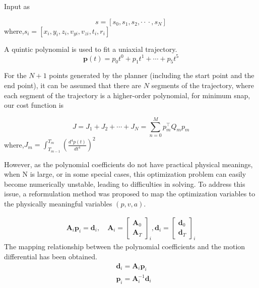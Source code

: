 \documentclass[times,authoryear]{elsarticle}
\begin{document}
Input as

\begin{equation}
	s = [s_{0},s_{1},s_{2},\cdot{}\cdot{}\cdot{},s_{N}]
\end{equation}
where,$s_{i} = [x_{i},y_{i},z_{i},v_{yi},v_{zi},t_{i},r_{i}]$

A quintic polynomial is used to fit a uniaxial trajectory.
\begin{equation}
	\boldsymbol{p}\left( {t}\right)= {p}_{0} {t}^{0}+ {p}_{1} {t}^{1}+\cdots+ {p}_{5} {t}^{5}
\end{equation}

For the $N+1$ points generated by the planner (including the start point and the end point), it can be assumed that there are $N$ segments of the trajectory, where each segment of the trajectory is a higher-order polynomial, for minimum snap, our cost function is

\begin{equation}
	J= J_{1}+J_{2}+\cdots+J_{N} = \sum_{n=0}^M p_{m}^\top Q_{m}p_{m}
\end{equation}
where,$J_{m} = \int^{T_{m}}_{{T_{m-1}}}\left( \frac{d^4p(t)}{dt^4} \right)^2$

However, as the polynomial coefficients do not have practical physical meanings, when N is large, or in some special cases, this optimization problem can easily become numerically unstable, leading to difficulties in solving. To address this issue, a reformulation method was proposed to map the optimization variables to the physically meaningful variables $(p,v,a)$.

\begin{equation}
	\begin{align}
		\boldsymbol{A}_i\boldsymbol{p}_i=\boldsymbol{d}_i,\quad \boldsymbol{A}_i=\begin{bmatrix}\boldsymbol{A}_0\\\boldsymbol{A}_T\end{bmatrix}_i,\boldsymbol{d}_i=\begin{bmatrix}\boldsymbol{d}_0\\\boldsymbol{d}_T\end{bmatrix}_i
	\end{align}
\end{equation}
The mapping relationship between the polynomial coefficients and the motion differential has been obtained.
\begin{equation}
	\begin{align}
		& \boldsymbol{d}_{i}
		= 
		\boldsymbol{A}_{i} 
		\boldsymbol{p}_{i} \\
		& \boldsymbol{p}_{i} = \boldsymbol{A}_{i}^{-1}\boldsymbol{d}_{i}
	\end{align}
\end{equation}
\end{document}
